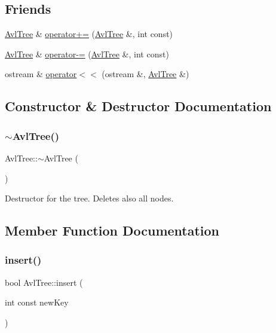 \subsection*{Friends}
\begin{DoxyCompactItemize}
\item 
\mbox{\hyperlink{class_avl_tree}{Avl\+Tree}} \& \mbox{\hyperlink{class_avl_tree_a7e8543fa39fcd41bf8738b1384658b3f}{operator+=}} (\mbox{\hyperlink{class_avl_tree}{Avl\+Tree}} \&, int const)
\item 
\mbox{\hyperlink{class_avl_tree}{Avl\+Tree}} \& \mbox{\hyperlink{class_avl_tree_aebcb43fe34dc651b0907a6cdeca29946}{operator-\/=}} (\mbox{\hyperlink{class_avl_tree}{Avl\+Tree}} \&, int const)
\item 
ostream \& \mbox{\hyperlink{class_avl_tree_a294c728291996899d248fb8ea9c9a038}{operator$<$$<$}} (ostream \&, \mbox{\hyperlink{class_avl_tree}{Avl\+Tree}} \&)
\end{DoxyCompactItemize}


\subsection{Constructor \& Destructor Documentation}
\mbox{\label{class_avl_tree_ada89cb30925d36a56e3aab8768752468}} 
\subsubsection{\texorpdfstring{$\sim$\+Avl\+Tree()}{~AvlTree()}}
{\footnotesize\ttfamily Avl\+Tree\+::$\sim$\+Avl\+Tree (\begin{DoxyParamCaption}{ }\end{DoxyParamCaption})}



Destructor for the tree. Deletes also all nodes. 



\subsection{Member Function Documentation}
\mbox{\label{class_avl_tree_a251736611b07cd83fe02f399288fc92e}} 
\subsubsection{\texorpdfstring{insert()}{insert()}}
{\footnotesize\ttfamily bool Avl\+Tree\+::insert (\begin{DoxyParamCaption}\item[{int const}]{new\+Key }\end{DoxyParamCaption})}

